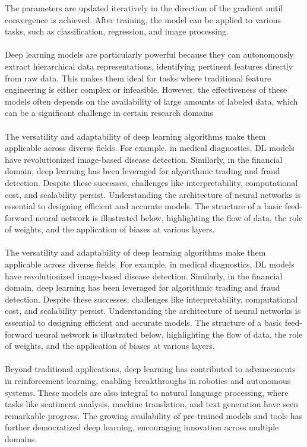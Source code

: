 \documentclass[a4paper]{article}
\begin{document}
\noindent The parameters are updated iteratively in the direction of the gradient until convergence is achieved. After training, the model can be applied to various tasks, such as classification, regression, and image processing.\\\\Deep learning models are particularly powerful because they can autonomously extract hierarchical data representations, identifying pertinent features directly from raw data. This makes them ideal for tasks where traditional feature engineering is either complex or infeasible. However, the effectiveness of these models often depends on the availability of large amounts of labeled data, which can be a significant challenge in certain research domains \\\\ The versatility and adaptability of deep learning algorithms make them applicable across diverse fields. For example, in medical diagnostics, DL models have revolutionized image-based disease detection. Similarly, in the financial domain, deep learning has been leveraged for algorithmic trading and fraud detection. Despite these successes, challenges like interpretability, computational cost, and scalability persist. Understanding the architecture of neural networks is essential to designing efficient and accurate models. The structure of a basic feed-forward neural network is illustrated below, highlighting the flow of data, the role of weights, and the application of biases at various layers. \\\\ The versatility and adaptability of deep learning algorithms make them applicable across diverse fields. For example, in medical diagnostics, DL models have revolutionized image-based disease detection. Similarly, in the financial domain, deep learning has been leveraged for algorithmic trading and fraud detection. Despite these successes, challenges like interpretability, computational cost, and scalability persist. Understanding the architecture of neural networks is essential to designing efficient and accurate models. The structure of a basic feed-forward neural network is illustrated below, highlighting the flow of data, the role of weights, and the application of biases at various layers.\\\\ Beyond traditional applications, deep learning has contributed to advancements in reinforcement learning, enabling breakthroughs in robotics and autonomous systems. These models are also integral to natural language processing, where tasks like sentiment analysis, machine translation, and text generation have seen remarkable progress. The growing availability of pre-trained models and tools has further democratized deep learning, encouraging innovation across multiple domains.
\end{document}

